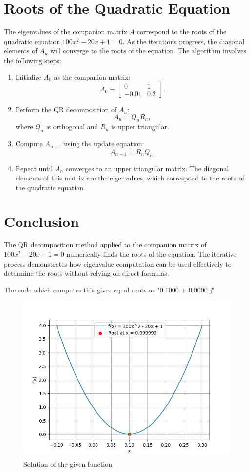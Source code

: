 \documentclass[journal]{IEEEtran}
\begin{document}
\section*{Roots of the Quadratic Equation}
The eigenvalues of the companion matrix \( A \) correspond to the roots of the quadratic equation \( 100x^2 - 20x + 1 = 0 \). As the iterations progress, the diagonal elements of \( A_n \) will converge to the roots of the equation. The algorithm involves the following steps:
\begin{enumerate}
    \item Initialize \( A_0 \) as the companion matrix:
    \[
    A_0 = \begin{bmatrix}
    0 & 1 \\
    -0.01 & 0.2
    \end{bmatrix}.
    \]
    \item Perform the QR decomposition of \( A_n \):
    \[
    A_n = Q_n R_n,
    \]
    where \( Q_n \) is orthogonal and \( R_n \) is upper triangular.
    \item Compute \( A_{n+1} \) using the update equation:
    \[
    A_{n+1} = R_n Q_n.
    \]
    \item Repeat until \( A_n \) converges to an upper triangular matrix. The diagonal elements of this matrix are the eigenvalues, which correspond to the roots of the quadratic equation.
\end{enumerate}

\section*{Conclusion}
The QR decomposition method applied to the companion matrix of \( 100x^2 - 20x + 1 = 0 \) numerically finds the roots of the equation. The iterative process demonstrates how eigenvalue computation can be used effectively to determine the roots without relying on direct formulas.



The code which computes this gives equal roots as "0.1000 + 0.0000 j"
\newline\newline
	\begin{figure}[h!]
		\centering
		\includegraphics[width=\columnwidth]{figs/Figure_1.png}
		\caption{Solution of the given function}
		\label{stemplot}
	\end{figure}
\end{document}
